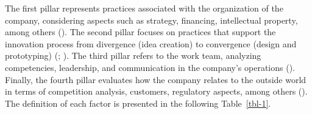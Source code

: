 \documentclass[
  12pt,
  oneside]{book}
\begin{document}
The first pillar represents practices associated with the organization
of the company, considering aspects such as strategy, financing,
intellectual property, among others (). The second pillar focuses on practices that support the
innovation process from divergence (idea creation) to convergence
(design and prototyping) (; ). The third pillar
refers to the work team, analyzing competencies, leadership, and
communication in the company's operations
().
Finally, the fourth pillar evaluates how the company relates to the
outside world in terms of competition analysis, customers, regulatory
aspects, among others (). The
definition of each factor is presented in the following
Table~\ref{tbl-1}.
\end{document}
